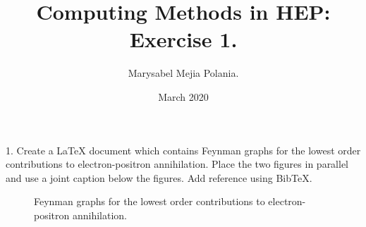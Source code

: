 \documentclass{article}
\title{Computing Methods in HEP: Exercise 1.}
\author{Marysabel Mejia Polania.}
\date{March 2020}
\begin{document}
\maketitle

1. Create a LaTeX document which contains Feynman graphs for the lowest order contributions to electron-positron annihilation. Place the two figures in parallel and use a joint caption below the figures. Add reference using BibTeX.

\vspace{20pt}

\begin{figure}[h]
\centering
\caption{Feynman graphs for the lowest order contributions to electron-positron annihilation. \cite{feynman}} 
\end{figure}



\end{document}
